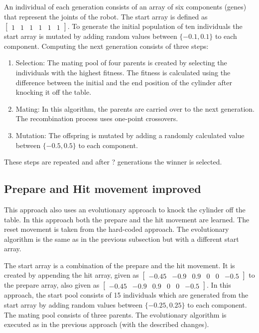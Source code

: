 \documentclass[10pt,twocolumn,letterpaper]{article}
\begin{document}
An individual of each generation consists of an array of six components (genes) that represent the joints of the robot. The start array is defined as $\begin{bmatrix}
				1 & 1 & 1 & 1 & 1 & 1
				\end{bmatrix}$.
To generate the initial population of ten individuals the start array is mutated by adding random values between $\{-0.1,0.1\}$ to each component.
Computing the next generation consists of three steps:
\begin{enumerate}
\item Selection: The mating pool of four parents is created by selecting the individuals with the highest fitness. The fitness is calculated using the difference between the initial and the end position of the cylinder after knocking it off the table.

\item Mating: In this algorithm, the parents are carried over to the next generation. The recombination process uses one-point crossovers. 

\item Mutation: The offspring is mutated by adding a randomly calculated value between $\{-0.5,0.5\}$ to each component.
\end{enumerate}

These steps are repeated and after ? generations the winner is selected.

\subsection{Prepare and Hit movement improved} 

This approach also uses an evolutionary approach to knock the cylinder off the table. In this approach both the prepare and the hit movement are learned. The reset movement is taken from the hard-coded approach. The evolutionary algorithm is the same as in the previous subsection but with a different start array. 

The start array is a combination of the prepare and the hit movement. It is  created by appending the hit array, given as  
$\begin{bmatrix}
-0.45 &  -0.9 & 0.9 & 0 & 0 & -0.5
\end{bmatrix}$ 
to the prepare array, also given as
$\begin{bmatrix}
-0.45 &  -0.9 & 0.9 & 0 & 0 & -0.5
\end{bmatrix}$.
In this approach, the start pool consists of 15 individuals which are generated from the start array by adding random values between $\{-0.25,0.25\}$ to each component. The mating pool consists of three parents.
The evolutionary algorithm is executed as in the previous approach (with the described changes).
\end{document}
